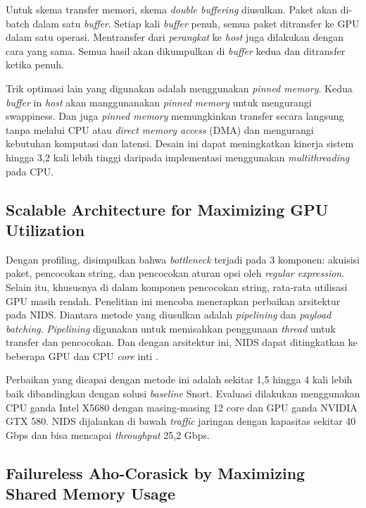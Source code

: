 \documentclass[conference]{IEEEtran}
\begin{document}
        Untuk skema transfer memori, skema \emph{double buffering} diusulkan. Paket akan di-batch dalam satu \emph{buffer}. Setiap kali \emph{buffer} penuh, semua paket ditransfer ke GPU dalam satu operasi. Mentransfer dari \emph{perangkat} ke \emph{host} juga dilakukan dengan cara yang sama. Semua hasil akan dikumpulkan di \emph{buffer} kedua dan ditransfer ketika penuh.
        
        Trik optimasi lain yang digunakan adalah menggunakan \emph{pinned memory}. Kedua \emph{buffer} in \emph{host} akan manggunanakan \emph{pinned memory} untuk mengurangi swappiness. Dan juga \emph{pinned memory} memungkinkan transfer secara langsung tanpa melalui CPU atau \emph{direct memory access} (DMA) dan mengurangi kebutuhan komputasi dan latensi. Desain ini dapat meningkatkan kinerja sistem hingga 3,2 kali lebih tinggi daripada implementasi menggunakan \emph{multithreading} pada CPU.

    \subsection{Scalable Architecture for Maximizing GPU Utilization}

        Dengan profiling, disimpulkan bahwa \emph{bottleneck} terjadi pada 3 komponen: akuisisi paket, pencocokan string, dan pencocokan aturan opsi oleh \emph{regular expression}. Selain itu, khususnya di dalam komponen pencocokan string, rata-rata utilisasi GPU masih rendah. Penelitian ini mencoba menerapkan perbaikan arsitektur pada NIDS. Diantara metode yang diusulkan adalah \emph{pipelining} dan \emph{payload batching}. \emph{Pipelining} digunakan untuk memisahkan penggunaan \emph{thread} untuk transfer dan pencocokan. Dan dengan arsitektur ini, NIDS dapat ditingkatkan ke beberapa GPU dan CPU \emph{core} inti \cite{kargus2012}.
        
        Perbaikan yang dicapai dengan metode ini adalah sekitar 1,5 hingga 4 kali lebih baik dibandingkan dengan solusi \emph{baseline} Snort. Evaluasi dilakukan menggunakan CPU ganda Intel X5680 dengan masing-masing 12 core dan GPU ganda NVIDIA GTX 580. NIDS dijalankan di bawah \emph{traffic} jaringan dengan kapasitas sekitar 40 Gbps dan bisa mencapai \emph{throughput} 25,2 Gbps.

    \subsection{Failureless Aho-Corasick by Maximizing Shared Memory Usage}
\end{document}
